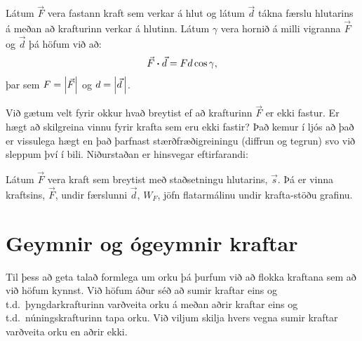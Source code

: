 \begin{tcolorbox}
\begin{theorem}
Látum $\vec{F}$ vera fastann kraft sem verkar á hlut og látum $\vec{d}$ tákna færslu hlutarins á meðan að krafturinn verkar á hlutinn. Látum $\gamma$ vera hornið á milli vigranna $\vec{F}$ og $\vec{d}$ þá höfum við að:
\begin{align*}
    \vec{F} \vdot \vec{d} = F d \cos\gamma,
\end{align*}
þar sem $F = \abs{\vec{F}}$ og $d = \abs{\vec{d}\,}$. 
\end{theorem}
\end{tcolorbox}

Við gætum velt fyrir okkur hvað breytist ef að krafturinn $\vec{F}$ er ekki fastur. Er hægt að skilgreina vinnu fyrir krafta sem eru ekki fastir? Það kemur í ljós að það er vissulega hægt en það þarfnast stærðfræðigreiningu (diffrun og tegrun) svo við sleppum því í bili. Niðurstaðan er hinsvegar eftirfarandi:

\begin{tcolorbox}
\begin{theorem} \label{theorem:flatarmalWork}
Látum $\Vec{F}$ vera kraft sem breytist með staðsetningu hlutarins, $\vec{s}$. Þá er vinna kraftsins, $\vec{F}$, undir færslunni $\vec{d}$, $W_F$, jöfn flatarmálinu undir krafta-stöðu grafinu.
\end{theorem}
\end{tcolorbox}

\section{Geymnir og ógeymnir kraftar}

Til þess að geta talað formlega um orku þá þurfum við að flokka kraftana sem að við höfum kynnst. Við höfum áður séð að sumir kraftar eins og t.d.~þyngdarkrafturinn varðveita orku á meðan aðrir kraftar eins og t.d.~núningskrafturinn tapa orku. Við viljum skilja hvers vegna sumir kraftar varðveita orku en aðrir ekki.

